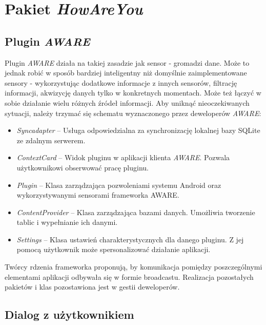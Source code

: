 
\section{Pakiet \textit{HowAreYou}}
\label{sec:pakietHowAreYou}


\subsection{Plugin \textit{AWARE}}

Plugin \textit{AWARE} działa na takiej zasadzie jak sensor - gromadzi dane. Może to jednak robić w sposób bardziej inteligentny niż domyślnie zaimplementowane sensory - wykorzystując dodatkowe informacje z innych sensorów, filtrację informacji, akwizycję danych tylko w konkretnych momentach. Może też łączyć w sobie działanie wielu różnych źródeł informacji. Aby uniknąć nieoczekiwanych sytuacji, należy trzymać się schematu wyznaczonego przez deweloperów \textit{AWARE}:

\begin{itemize}
\item \textit{Syncadapter} -- Usługa odpowiedzialna za synchronizację lokalnej bazy SQLite ze zdalnym serwerem.

\item \textit{ContextCard} -- Widok pluginu w aplikacji klienta \textit{AWARE}. Pozwala użytkownikowi obserwować pracę pluginu.

\item \textit{Plugin} -- Klasa zarządzająca pozwoleniami systemu Android oraz wykorzystywanymi sensorami frameworka AWARE.

\item \textit{ContentProvider} -- Klasa zarządzająca bazami danych. Umożliwia tworzenie tablic i wypełnianie ich danymi.

\item \textit{Settings} -- Klasa ustawień charakterystycznych dla danego pluginu. Z jej pomocą użytkownik może spersonalizować działanie aplikacji.
\end{itemize}

Twórcy rdzenia frameworka proponują, by komunikacja pomiędzy poszczególnymi elementami aplikacji odbywała się w formie broadcastu. Realizacja pozostałych pakietów i klas pozostawiona jest w gestii deweloperów\cite{AwareFramework}. 


\subsection{Dialog z użytkownikiem}

